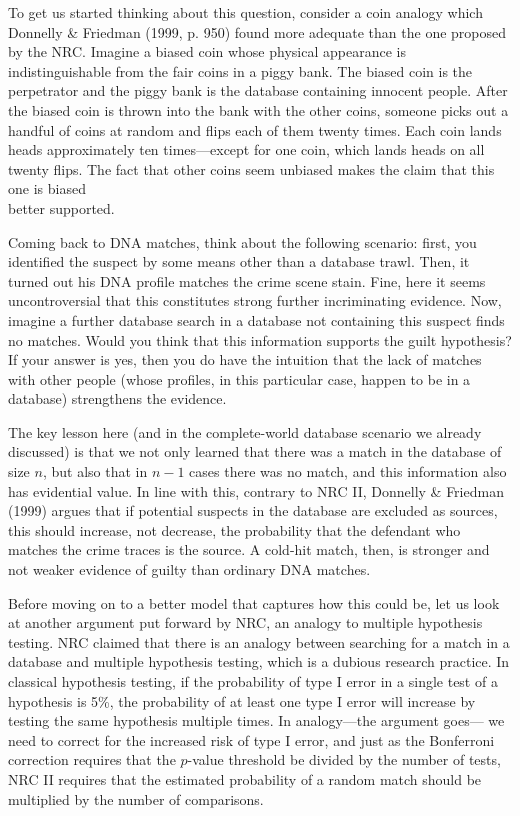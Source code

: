\documentclass[
  10pt,
  dvipsnames,enabledeprecatedfontcommands]{scrartcl}
\begin{document}
To get us started thinking about this question, consider a coin analogy
which Donnelly \& Friedman (1999, p. 950) found more adequate than the
one proposed by the NRC. Imagine a biased coin whose physical appearance
is indistinguishable from the fair coins in a piggy bank. The biased
coin is the perpetrator and the piggy bank is the database containing
innocent people. After the biased coin is thrown into the bank with the
other coins, someone picks out a handful of coins at random and flips
each of them twenty times. Each coin lands heads approximately ten
times---except for one coin, which lands heads on all twenty flips. The
fact that other coins seem unbiased makes the claim that this one is
biased\\
better supported.

Coming back to DNA matches, think about the following scenario: first,
you identified the suspect by some means other than a database trawl.
Then, it turned out his DNA profile matches the crime scene stain. Fine,
here it seems uncontroversial that this constitutes strong further
incriminating evidence. Now, imagine a further database search in a
database not containing this suspect finds no matches. Would you think
that this information supports the guilt hypothesis? If your answer is
yes, then you do have the intuition that the lack of matches with other
people (whose profiles, in this particular case, happen to be in a
database) strengthens the evidence.

The key lesson here (and in the complete-world database scenario we
already discussed) is that we not only learned that there was a match in
the database of size \(n\), but also that in \(n-1\) cases there was no
match, and this information also has evidential value. In line with
this, contrary to NRC II, Donnelly \& Friedman (1999) argues that if
potential suspects in the database are excluded as sources, this should
increase, not decrease, the probability that the defendant who matches
the crime traces is the source. A cold-hit match, then, is stronger and
not weaker evidence of guilty than ordinary DNA matches.

Before moving on to a better model that captures how this could be, let
us look at another argument put forward by NRC, an analogy to multiple
hypothesis testing. NRC claimed that there is an analogy between
searching for a match in a database and multiple hypothesis testing,
which is a dubious research practice. In classical hypothesis testing,
if the probability of type I error in a single test of a hypothesis is
5\%, the probability of at least one type I error will increase by
testing the same hypothesis multiple times. In analogy---the argument
goes--- we need to correct for the increased risk of type I error, and
just as the Bonferroni correction requires that the \(p\)-value
threshold be divided by the number of tests, NRC II requires that the
estimated probability of a random match should be multiplied by the
number of comparisons.
\end{document}
